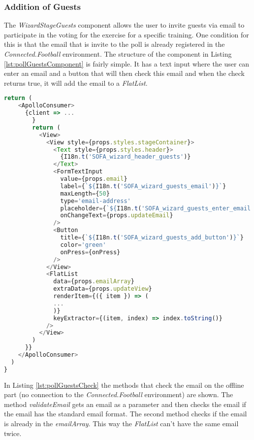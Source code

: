 \subsubsection{Addition of Guests}
\label{sssec:poll_guests}

The \textit{WizardStageGuests} component allows the user to invite guests via email to participate in the voting for the exercise for a specific training. One condition for this is that the email that is invite to the poll is already registered in the \textit{Connected.Football} environment. 
\newline
The structure of the component in Listing \ref{lst:pollGuestsComponent} is fairly simple. It has a text input where the user can enter an email and a button that will then check this email and when the check returns true, it will add the email to a \textit{FlatList}. 
\begin{lstlisting}[language=javascript, caption=Simplified Guest Component, label=lst:pollGuestsComponent]
return (
    <ApolloConsumer>
      {client => ...
        }
        return (
          <View>
            <View style={props.styles.stageContainer}>
              <Text style={props.styles.header}>
                {I18n.t('SOFA_wizard_header_guests')}
              </Text>
              <FormTextInput
                value={props.email}
                label={`${I18n.t('SOFA_wizard_guests_email')}`}
                maxLength={50}
                type='email-address'
                placeholder={`${I18n.t('SOFA_wizard_guests_enter_email')}`}
                onChangeText={props.updateEmail}
              />
              <Button
                title={`${I18n.t('SOFA_wizard_guests_add_button')}`}
                color='green'
                onPress={onPress}
              />
            </View>
            <FlatList
              data={props.emailArray}
              extraData={props.updateView}
              renderItem={({ item }) => (
              ...
              )}
              keyExtractor={(item, index) => index.toString()}
            />
          </View>
        )
      }}
    </ApolloConsumer>
  )
}
\end{lstlisting}

In Listing \ref{lst:pollGuestsCheck} the methods that check the email on the offline part (no connection to the \textit{Connected.Football} environment) are shown. The method \textit{validateEmail} gets an email as a parameter and then checks the email if the email has the standard email format. The second method checks if the email is already in the \textit{emailArray}. This way the \textit{FlatList} can't have the same email twice.

